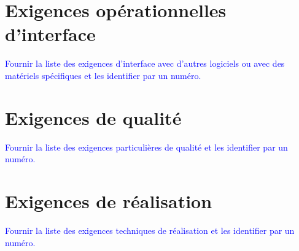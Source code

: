 \documentclass[a4paper,11pt,french]{article}
\begin{document}
\section{Exigences opérationnelles d'interface}

\textcolor{blue}{
  Fournir la liste des exigences d’interface avec d’autres logiciels ou avec des matériels 
  spécifiques et les identifier par un numéro.
}

\section{Exigences de qualité}

\textcolor{blue}{
  Fournir la liste des exigences particulières de qualité et les identifier par un numéro.
}

\section{Exigences de réalisation}

\textcolor{blue}{
  Fournir la liste des exigences techniques de réalisation et les identifier par un numéro.
}
\end{document}
